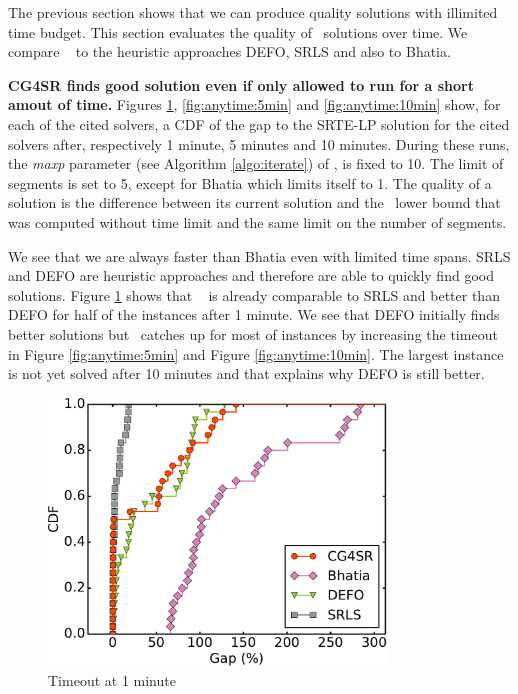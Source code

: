 The previous section shows that we can produce quality solutions with illimited time budget.
This section evaluates the quality of \name~solutions over time.
We compare \name~ to the heuristic approaches DEFO, SRLS and also to Bhatia.

\textbf{CG4SR finds good solution even if only allowed to run for a short amout of time.}
Figures \ref{fig:anytime:1min}, \ref{fig:anytime:5min}
and \ref{fig:anytime:10min} show, for each of the cited solvers, a CDF of the gap
to the SRTE-LP solution for the cited solvers after,
respectively 1 minute, 5 minutes and 10 minutes.
During these runs, the \textit{maxp} parameter (see Algorithm \ref{algo:iterate}) of \name, is fixed to 10.
The limit of segments is set to 5, except for Bhatia which limits itself to 1.
The quality of a solution is the difference between its current solution and the \name~lower bound
that was computed without time limit and the same limit on the number of segments.

We see that we are always faster than Bhatia even with limited time spans.
SRLS and DEFO are heuristic approaches and therefore are able to quickly find good solutions.
Figure \ref{fig:anytime:1min} shows that \name~ is already comparable to SRLS and better than DEFO
for half of the instances after 1 minute.
We see that DEFO initially finds better solutions but \name~catches up for most of instances
by increasing the timeout in Figure \ref{fig:anytime:5min} and Figure \ref{fig:anytime:10min}.
The largest instance is not yet solved after 10 minutes and that explains why DEFO is still better.

\begin{figure}
\begin{center}
\includegraphics[width=0.8\textwidth]{images/solver_gap_optim_60-6.2016RocketFuelUCL.cdfs.pdf}
\caption{Timeout at 1 minute}
\label{fig:anytime:1min}
\end{center}
\end{figure}

